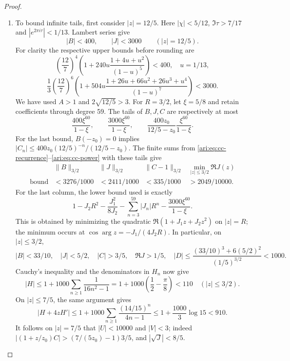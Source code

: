 \begin{proof}
\begin{enumerate}[label=\arabic*.,leftmargin=*]
\item To bound infinite tails, first consider $|z|=12/5$.
Here $|\chi|<5/12$, $\Im\tau>7/17$ and
$|e^{2\pi i\tau}|<1/13$. Lambert series give
\begin{equation}\label{ari:eq:cc-outer}
 |B|<400,\qquad |J|<3000\qquad (|z|=12/5).
\end{equation}
For clarity the respective upper bounds before rounding are
\[
 \left(\frac{12}{7}\right)^4
 \left(1+240u\frac{1+4u+u^2}{(1-u)^5}\right)<400,
 \quad u=1/13,
\]
\[
 \frac13\left(\frac{12}{7}\right)^6
 \left(1+504u\frac{1+26u+66u^2+26u^3+u^4}{(1-u)^7}\right)<3000.
\]
We have used $A>1$ and $2\sqrt{12/5}>3$.
For $R=3/2$, let $\xi=5/8$ and retain coefficients through
degree 59. The tails of $B,J,C$ are respectively at most
\begin{equation}\label{ari:eq:cc-tail60}
 \frac{400\xi^{60}}{1-\xi},\qquad
 \frac{3000\xi^{60}}{1-\xi},\qquad
 \frac{400z_0}{12/5-z_0}\frac{\xi^{60}}{1-\xi}.
\end{equation}
For the last bound, $B(-z_0)=0$ implies
$|C_n|\le400z_0(12/5)^{-n}/(12/5-z_0)$.
The finite sums from \eqref{ari:eq:cc-recurrence}--\eqref{ari:eq:cc-power}
with these tails give
\[
 \begin{array}{c|cccc}
 &\|B\|_{3/2}&\|J\|_{3/2}&\|C-1\|_{3/2}
                   &\min_{|z|\le3/2}\Re J(z)\\ \hline
 \text{bound}&<3276/1000&<2411/1000&<335/1000&>2049/10000.
 \end{array}
\]
For the last column, the lower bound used is exactly
\[
 1-J_2R^2-\frac{J_1^2}{8J_2}
       -\sum_{n=3}^{59}|J_n|R^n-
                   \frac{3000\xi^{60}}{1-\xi}.
\]
This is obtained by minimizing the quadratic
$\Re(1+J_1z+J_2z^2)$ on $|z|=R$; the minimum occurs at
$\cos\arg z=-J_1/(4J_2R)$. In particular, on $|z|\le3/2$,
\[
 |B|<33/10,\quad |J|<5/2,\quad |C|>3/5,\quad
 \Re J>1/5,\quad
 |D|\le\frac{(33/10)^3+6(5/2)^2}{(1/5)^{3/2}}<1000.
\]
Cauchy's inequality and the denominators in $H_n$ now give
\[
 |H|\le1+1000\sum_{n\ge1}\frac1{16n^2-1}
       =1+1000\left(\frac12-\frac\pi8\right)<110
                      \quad (|z|\le3/2).
\]
On $|z|\le7/5$, the same argument gives
\[
 |H+4zH'|\le1+1000\sum_{n\ge1}
                 \frac{(14/15)^n}{4n-1}
       \le1+\frac{1000}{3}\log15<910.
\]
It follows on $|z|=7/5$ that $|U|<10000$ and $|V|<3$;
indeed $|(1+z/z_0)C|>(7/(5z_0)-1)3/5$, and
$|\sqrt J|<8/5$.


\end{enumerate}
\end{proof}
